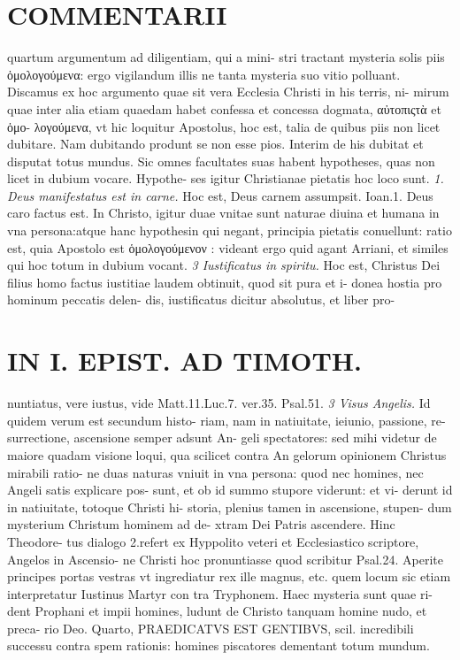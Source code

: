 \documentclass{article}
\begin{document}
\begin{pages}
\section*{COMMENTARII }\pstart quartum argumentum ad diligentiam, qui a mini- stri tractant mysteria solis piis ὁμολογούμενα: ergo vigilandum illis ne tanta mysteria suo vitio polluant. Discamus ex hoc argumento quae sit vera Ecclesia Christi in his terris, ni- mirum quae inter alia etiam quaedam habet confessa et concessa dogmata, αὐτοπιςτὰ et ὁμο- λογούμενα, vt hic loquitur Apostolus, hoc est, talia de quibus piis non licet dubitare. Nam dubitando produnt se non esse pios. Interim de his dubitat et disputat totus mundus. Sic omnes facultates suas habent hypotheses, quas non licet in dubium vocare. Hypothe- ses igitur Christianae pietatis hoc loco sunt.  \pend
\textit{1. Deus manifestatus est in carne. }\pstart Hoc est, Deus carnem assumpsit. Ioan.1. Deus caro factus est. In Christo, igitur duae vnitae sunt naturae diuina et humana in vna persona:atque hanc hypothesin qui negant, principia pietatis conuellunt: ratio est, quia Apostolo est ὁμολογούμενον : videant ergo quid agant Arriani, et similes qui hoc totum in dubium vocant.  \pend
\textit{3 Iustificatus in spiritu. }\pstart Hoc est, Christus Dei filius homo factus iustitiae laudem obtinuit, quod sit pura et i- donea hostia pro hominum peccatis delen- dis, iustificatus dicitur absolutus, et liber pro-  \pend
\section*{IN I. EPIST. AD TIMOTH. }
\marginpar{[ p.81 ]}\pstart nuntiatus, vere iustus, vide Matt.11.Luc.7. ver.35. Psal.51.  \pend
\textit{3 Visus Angelis. }\pstart Id quidem verum est secundum histo- riam, nam in natiuitate, ieiunio, passione, re- surrectione, ascensione semper adsunt An- geli spectatores: sed mihi videtur de maiore quadam visione loqui, qua scilicet contra An gelorum opinionem Christus mirabili ratio- ne duas naturas vniuit in vna persona: quod nec homines, nec Angeli satis explicare pos- sunt, et ob id summo stupore viderunt: et vi- derunt id in natiuitate, totoque Christi hi- storia, plenius tamen in ascensione, stupen- dum mysterium Christum hominem ad de- xtram Dei Patris ascendere. Hinc Theodore- tus dialogo 2.refert ex Hyppolito veteri et Ecclesiastico scriptore, Angelos in Ascensio- ne Christi hoc pronuntiasse quod scribitur Psal.24. Aperite principes portas vestras vt ingrediatur rex ille magnus, etc. quem locum sic etiam interpretatur Iustinus Martyr con tra Tryphonem. Haec mysteria sunt quae ri- dent Prophani et impii homines, ludunt de Christo tanquam homine nudo, et preca- rio Deo.  \pend\pstart Quarto, PRAEDICATVS EST GENTIBVS, scil. incredibili successu contra spem rationis: homines piscatores dementant totum mundum.  \pend
\marginpar{[ p.82 ]}

\end{pages}
\end{document}
